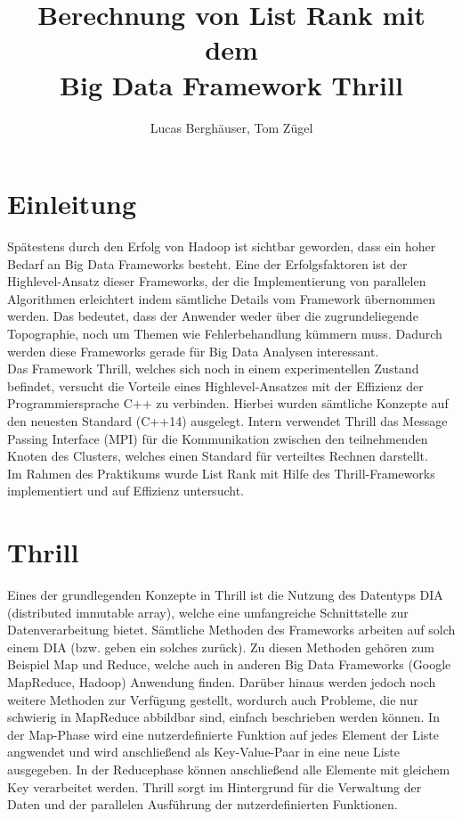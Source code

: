 \documentclass[a0,portrait]{a0poster}
\author{Lucas Berghäuser, Tom Zügel}
\title{Berechnung von List Rank mit dem\\ Big Data Framework Thrill}
\begin{document}
    \begin{multicols}{2}
        
\section*{Einleitung}
Spätestens durch den Erfolg von Hadoop ist sichtbar geworden, dass ein hoher
 Bedarf an Big Data Frameworks besteht. Eine der Erfolgsfaktoren ist der
 Highlevel-Ansatz dieser Frameworks, der die Implementierung von parallelen
 Algorithmen erleichtert indem sämtliche Details vom Framework übernommen
 werden. Das bedeutet, dass der Anwender weder über die zugrundeliegende
 Topographie, noch um Themen wie Fehlerbehandlung kümmern muss. Dadurch werden
 diese Frameworks gerade für Big Data Analysen interessant.\\
 Das Framework Thrill, welches sich noch in einem experimentellen Zustand
 befindet, versucht die Vorteile eines Highlevel-Ansatzes mit der Effizienz der
 Programmiersprache C++ zu verbinden. Hierbei wurden sämtliche Konzepte auf den
 neuesten Standard (C++14) ausgelegt. Intern verwendet Thrill das Message
 Passing Interface (MPI) für die Kommunikation zwischen den teilnehmenden Knoten
 des Clusters, welches einen Standard für verteiltes Rechnen darstellt.\\
 Im Rahmen des Praktikums wurde List Rank mit Hilfe des Thrill-Frameworks
 implementiert und auf Effizienz untersucht.
 
       
\section*{Thrill}
Eines der grundlegenden Konzepte in Thrill ist die Nutzung des Datentyps
DIA (distributed immutable array), welche eine umfangreiche Schnittstelle zur
Datenverarbeitung bietet. Sämtliche Methoden des Frameworks arbeiten auf solch
einem DIA (bzw. geben ein solches zurück). Zu diesen Methoden gehören zum
Beispiel Map und Reduce, welche auch in anderen Big Data Frameworks (Google
MapReduce, Hadoop) Anwendung finden. Darüber hinaus werden jedoch noch weitere
Methoden zur Verfügung gestellt, wordurch auch Probleme, die nur schwierig in
MapReduce abbildbar sind, einfach beschrieben werden können.
In der Map-Phase wird eine nutzerdefinierte Funktion auf jedes Element der Liste
angwendet und wird anschließend als Key-Value-Paar in eine neue Liste
ausgegeben. In der Reducephase können anschließend alle Elemente mit gleichem
Key verarbeitet werden. Thrill sorgt im Hintergrund für die Verwaltung der Daten
und der parallelen Ausführung der nutzerdefinierten Funktionen.


\end{multicols}
\end{document}
